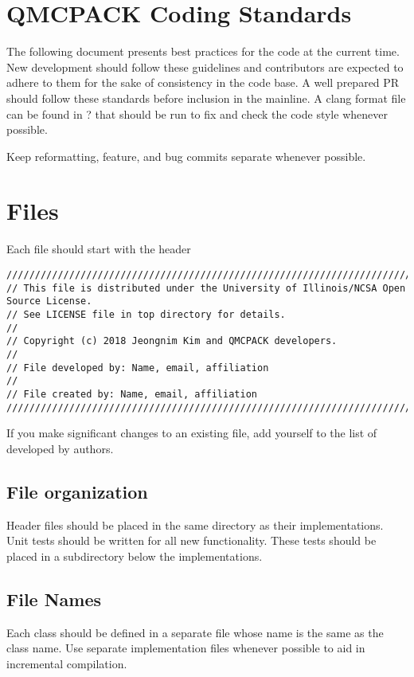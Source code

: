 \section{QMCPACK Coding Standards}

The following document presents best practices for the code at the current time. New development should follow these guidelines and contributors are expected to adhere to them for the sake of consistency in the code base. A well prepared PR should follow these standards before inclusion in the mainline. A clang format file can be found in ? that should be run to fix and check the code style whenever possible.

Keep reformatting, feature, and bug commits separate whenever possible.  


\section{Files}
Each file should start with the header
\begin{lstlisting}
//////////////////////////////////////////////////////////////////////////////////////
// This file is distributed under the University of Illinois/NCSA Open Source License.
// See LICENSE file in top directory for details.
//
// Copyright (c) 2018 Jeongnim Kim and QMCPACK developers.
//
// File developed by: Name, email, affiliation
//
// File created by: Name, email, affiliation
//////////////////////////////////////////////////////////////////////////////////////
\end{lstlisting}
If you make significant changes to an existing file, add yourself to the list of developed by authors.

\subsection{File organization}
Header files should be placed in the same directory as their implementations. 
Unit tests should be written for all new functionality. These tests should be placed in a  subdirectory below the implementations.

\subsection{File Names}
Each class should be defined in a separate file whose name is the same as the class name. Use separate  implementation files whenever possible to aid in incremental compilation. 

